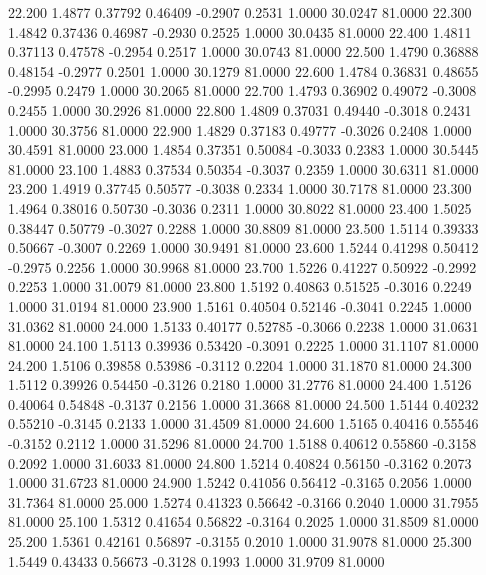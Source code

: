   22.200   1.4877   0.37792   0.46409  -0.2907   0.2531   1.0000  30.0247  81.0000
  22.300   1.4842   0.37436   0.46987  -0.2930   0.2525   1.0000  30.0435  81.0000
  22.400   1.4811   0.37113   0.47578  -0.2954   0.2517   1.0000  30.0743  81.0000
  22.500   1.4790   0.36888   0.48154  -0.2977   0.2501   1.0000  30.1279  81.0000
  22.600   1.4784   0.36831   0.48655  -0.2995   0.2479   1.0000  30.2065  81.0000
  22.700   1.4793   0.36902   0.49072  -0.3008   0.2455   1.0000  30.2926  81.0000
  22.800   1.4809   0.37031   0.49440  -0.3018   0.2431   1.0000  30.3756  81.0000
  22.900   1.4829   0.37183   0.49777  -0.3026   0.2408   1.0000  30.4591  81.0000
  23.000   1.4854   0.37351   0.50084  -0.3033   0.2383   1.0000  30.5445  81.0000
  23.100   1.4883   0.37534   0.50354  -0.3037   0.2359   1.0000  30.6311  81.0000
  23.200   1.4919   0.37745   0.50577  -0.3038   0.2334   1.0000  30.7178  81.0000
  23.300   1.4964   0.38016   0.50730  -0.3036   0.2311   1.0000  30.8022  81.0000
  23.400   1.5025   0.38447   0.50779  -0.3027   0.2288   1.0000  30.8809  81.0000
  23.500   1.5114   0.39333   0.50667  -0.3007   0.2269   1.0000  30.9491  81.0000
  23.600   1.5244   0.41298   0.50412  -0.2975   0.2256   1.0000  30.9968  81.0000
  23.700   1.5226   0.41227   0.50922  -0.2992   0.2253   1.0000  31.0079  81.0000
  23.800   1.5192   0.40863   0.51525  -0.3016   0.2249   1.0000  31.0194  81.0000
  23.900   1.5161   0.40504   0.52146  -0.3041   0.2245   1.0000  31.0362  81.0000
  24.000   1.5133   0.40177   0.52785  -0.3066   0.2238   1.0000  31.0631  81.0000
  24.100   1.5113   0.39936   0.53420  -0.3091   0.2225   1.0000  31.1107  81.0000
  24.200   1.5106   0.39858   0.53986  -0.3112   0.2204   1.0000  31.1870  81.0000
  24.300   1.5112   0.39926   0.54450  -0.3126   0.2180   1.0000  31.2776  81.0000
  24.400   1.5126   0.40064   0.54848  -0.3137   0.2156   1.0000  31.3668  81.0000
  24.500   1.5144   0.40232   0.55210  -0.3145   0.2133   1.0000  31.4509  81.0000
  24.600   1.5165   0.40416   0.55546  -0.3152   0.2112   1.0000  31.5296  81.0000
  24.700   1.5188   0.40612   0.55860  -0.3158   0.2092   1.0000  31.6033  81.0000
  24.800   1.5214   0.40824   0.56150  -0.3162   0.2073   1.0000  31.6723  81.0000
  24.900   1.5242   0.41056   0.56412  -0.3165   0.2056   1.0000  31.7364  81.0000
  25.000   1.5274   0.41323   0.56642  -0.3166   0.2040   1.0000  31.7955  81.0000
  25.100   1.5312   0.41654   0.56822  -0.3164   0.2025   1.0000  31.8509  81.0000
  25.200   1.5361   0.42161   0.56897  -0.3155   0.2010   1.0000  31.9078  81.0000
  25.300   1.5449   0.43433   0.56673  -0.3128   0.1993   1.0000  31.9709  81.0000
